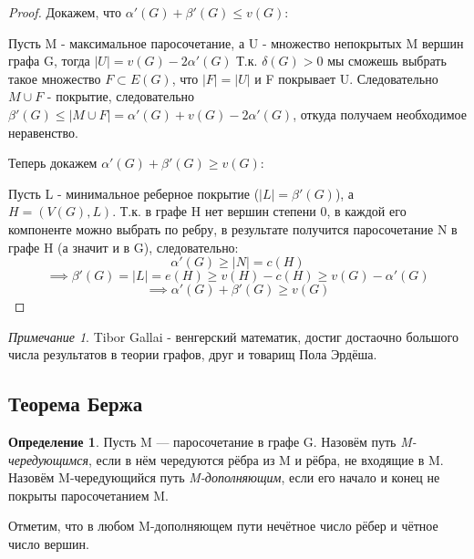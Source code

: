 \documentclass{article}
\renewcommand{\le}{\leqslant}
\renewcommand{\ge}{\geqslant}
\theoremstyle{definition}
\newtheorem{definition}{Определение}[section]
\theoremstyle{remark}
\newtheorem*{remark}{Примечание}
\begin{document}
\begin{proof}
    Докажем, что  $\alpha'(G) + \beta'(G) \le v(G)$: 
    
    Пусть M - максимальное паросочетание, а U - множество непокрытых M вершин графа G, тогда $|U| = v(G) - 2\alpha'(G)$
    Т.к. $\delta(G) > 0$ мы сможешь выбрать такое множество $F \subset E(G)$, что $|F| = |U|$ и F покрывает  U. Следовательно $M \cup F$ - покрытие, следовательно 
    $\beta'(G) \le |M \cup F| = \alpha'(G) + v(G) - 2\alpha'(G)$, откуда получаем необходимое неравенство.
    
    Теперь докажем $\alpha'(G) + \beta'(G) \ge v(G)$:

    Пусть L - минимальное реберное покрытие ($|L| = \beta'(G)$), а \\ $H = (V(G), L)$.
    Т.к. в графе H нет вершин степени 0, в каждой его компоненте можно выбрать по ребру, в результате получится паросочетание N в графе H (а значит и в G), следовательно: 
    $$
    \alpha'(G) \ge |N| = c(H)
    $$
    $$
    \implies \beta'(G) = |L| = e(H) \ge v(H) - c(H) \ge v(G) - \alpha'(G)
    $$
    $$
    \implies \alpha'(G) + \beta'(G) \ge v(G)
    $$
\end{proof}

\begin{remark}
    Tibor Gallai - венгерский математик, достиг достаочно большого числа результатов в теории графов, друг и товарищ Пола Эрдёша.
\end{remark}

\subsection{Теорема Бержа}

\begin{definition}
    Пусть M — паросочетание в графе G. Назовём путь \textit{M-чередующимся}, если в нём чередуются рёбра из M и рёбра, не входящие в M. Назовём M-чередующийся путь \textit{M-дополняющим}, если его начало и конец не покрыты паросочетанием M.
\end{definition}

Отметим, что в любом M-дополняющем пути нечётное число рёбер и
чётное число вершин.
\end{document}
